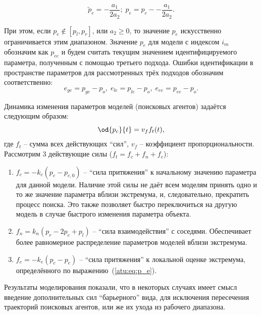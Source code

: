 \begin{equation}
  \tilde{p}_e = - \frac{a_1}{2 a_2};
  \;
  p_e = p_c -- \frac{a_1}{2 a_2}.
  \label{atu:eq:p_e}
\end{equation}


При этом, если
$ p_e \notin [ p_l, p_r ] $, или $ a_2 \ge 0 $, то значение $p_e$ искусственно
ограничивается этим диапазоном. Значение $p_e$ для модели с индексом
$i_m$ обозначим как $p_{ee}$ и будем считать
текущим значением идентифицируемого параметра, полученным с помощью
третьего подхода. Ошибки идентификации в пространстве параметров
для рассмотренных трёх подходов обозначим соответственно:
%
\begin{equation}
  e_{ge} = p_{ge} - p_o, \;
  e_{le} = p_{le} - p_o, \;
  e_{ee} = p_{ee} - p_o.
  \label{atu:eq:e_xx}
\end{equation}


Динамика изменения параметров моделей (поисковых агентов) задаётся следующим образом:
%
\begin{equation}
  \od{p_c}{t} = v_f f_t(t),
  \label{atu:eq:dp_dt}
\end{equation}
%
\noindent
где $f_t$ -- сумма всех действующих ``сил'', $v_f$ -- коэффициент
пропорциональности. Рассмотрим 3 действующие силы
($ f_t = f_c + f_n + f_e $):

\begin{enumerate}
  \item
    $f_c = -k_c (p_c - p_{c,0}) $ -- ``сила притяжения'' к начальному значению
    параметра
    для данной модели. Наличие этой силы не даёт всем моделям принять одно
    и то же значение параметра вблизи экстремума, и, следовательно,
    прекратить процесс поиска. Это также позволяет быстро переключиться
    на другую модель в случае быстрого изменения параметра объекта.

  \item
    $f_n = k_n ( p_r - 2 p_c + p_l ) $ -- ``сила взаимодействия''
    с соседями. Обеспечивает более равномерное распределение
    параметров моделей вблизи экстремума.

  \item
    $f_e = - k_e ( p_c - p_e ) $ -- ``сила притяжения'' к локальной
    оценке экстремума, определённого по выражению~(\ref{atu:eq:p_e}).

\end{enumerate}

Результаты моделирования показали, что в некоторых случаях
имеет смысл введение дополнительных сил ``барьерного'' вида,
для исключения пересечения траекторий поисковых агентов, или же их ухода из рабочего диапазона.



